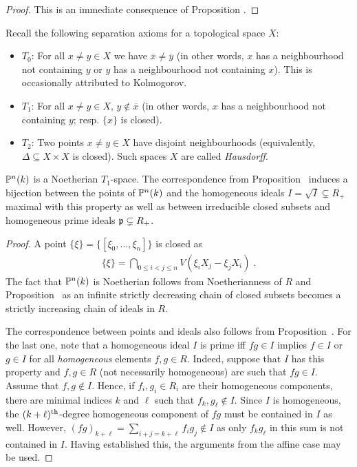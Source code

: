 \documentclass[a4paper,parskip=half,numbers=enddot, DIV=12]{scrreprt}
\begin{document}
\begin{proof}
	This is an immediate consequence of Proposition .
\end{proof}
\begin{rem*}Recall the following separation axioms for a topological space $X$:
\begin{itemize}
\item $T_0$:
For all $x\neq y\in X$ we have $\overline x\neq\overline y$ (in other words, $x$ has a neighbourhood
not containing $y$ or $y$ has a neighbourhood not containing $x$). This is occasionally attributed to Kolmogorov.
\item $T_1$: For all $x\neq y\in X$, $y\notin\overline x$ (in other words, $x$ has a neighbourhood not containing $y$;
resp. $\{x\}$ is closed).
\item $T_2$: Two points $x\neq y\in X$ have disjoint neighbourhoods (equivalently, $\Delta\subseteq X\times X$ is closed). Such spaces $X$ are called \emph{Hausdorff}.
\end{itemize}
\end{rem*}
\begin{prop}
$\mathbb{P}^n(k)$ is a Noetherian $T_1$-space. The correspondence from  Proposition~ induces a bijection between the points of $\mathbb{P}^n(k)$ and the homogeneous
ideals $I=\sqrt I\subsetneq R_+$ maximal with this property as well as between irreducible closed subsets and homogeneous prime ideals $\mathfrak{p}\subsetneq R_+$.
\end{prop}
\begin{proof}
A point $\{\xi\} = \{[\xi_0,\ldots,\xi_n]\}$ is closed as 
\begin{align*}
	\{\xi\}=\bigcap_{0\leq i<j\leq n} V( \xi_i X_j - \xi_j X_i)\;.
\end{align*}
The fact that $\mathbb{P}^n(k)$ is Noetherian follows from Noetherianness of $R$ and Proposition~
as an infinite strictly decreasing chain of closed subsets becomes a strictly increasing chain of ideals in $R$.

The correspondence between points and ideals also follows from Proposition~. For the last one, note that a homogeneous ideal $I$ is prime iff $fg\in I$ implies $f\in I$ or $g\in I$ for all \emph{homogeneous} elements $f,g\in R$. Indeed, suppose that $I$ has this property and $f,g\in R$ (not necessarily homogeneous) are such that $fg\in I$. Assume that $f,g\notin I$. Hence, if $f_i,g_i\in R_i$ are their homogeneous components, there are minimal indices $k$ and $\ell$ such that $f_k,g_\ell\notin I$. Since $I$ is homogeneous, the $(k+\ell)^{\text{th}}$-degree homogeneous component of $fg$ must be contained in $I$ as well. However, $(fg)_{k+\ell}=\sum_{i+j=k+\ell}f_ig_j\notin I$ as only $f_kg_\ell$ in this sum is not contained in $I$. Having established this, the arguments from the affine case may be used.
\end{proof}
\end{document}
